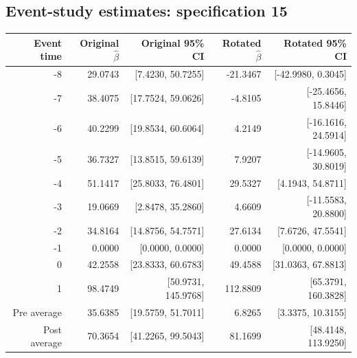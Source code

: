 \documentclass[10pt]{article}
\begin{document}
\subsection*{Event-study estimates: specification 15}
\begin{center}\scriptsize
\begin{tabular}{r rr rr}
\toprule
Event time & Original $\hat\beta$ & Original 95\% CI & Rotated $\hat\beta$ & Rotated 95\% CI \\
\midrule
-8 & 29.0743 & [7.4230, 50.7255] & -21.3467 & [-42.9980, 0.3045] \\
-7 & 38.4075 & [17.7524, 59.0626] & -4.8105 & [-25.4656, 15.8446] \\
-6 & 40.2299 & [19.8534, 60.6064] & 4.2149 & [-16.1616, 24.5914] \\
-5 & 36.7327 & [13.8515, 59.6139] & 7.9207 & [-14.9605, 30.8019] \\
-4 & 51.1417 & [25.8033, 76.4801] & 29.5327 & [4.1943, 54.8711] \\
-3 & 19.0669 & [2.8478, 35.2860] & 4.6609 & [-11.5583, 20.8800] \\
-2 & 34.8164 & [14.8756, 54.7571] & 27.6134 & [7.6726, 47.5541] \\
-1 & 0.0000 & [0.0000, 0.0000] & 0.0000 & [0.0000, 0.0000] \\
0 & 42.2558 & [23.8333, 60.6783] & 49.4588 & [31.0363, 67.8813] \\
1 & 98.4749 & [50.9731, 145.9768] & 112.8809 & [65.3791, 160.3828] \\
\midrule
Pre average & 35.6385 & [19.5759, 51.7011] & 6.8265 & [3.3375, 10.3155] \\
Post average & 70.3654 & [41.2265, 99.5043] & 81.1699 & [48.4148, 113.9250] \\
\bottomrule
\end{tabular}
\end{center}
\clearpage
\end{document}
